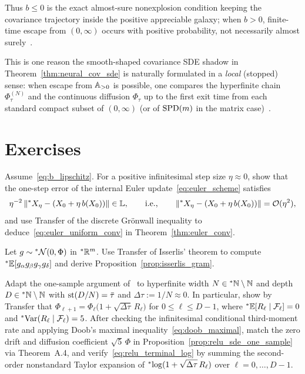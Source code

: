 Thus $b \le 0$ is the exact almost-sure nonexplosion condition keeping the covariance trajectory inside the positive appreciable galaxy; when $b > 0$, finite-time escape from $(0, \infty)$ occurs with positive probability, not necessarily almost surely~\cite[Section~4]{li2022neural}.

This is one reason the smooth-shaped covariance SDE shadow in Theorem~\ref{thm:neural_cov_sde} is naturally formulated in a \emph{local} (stopped) sense: when escape from $\mathbb{A}_{>0}$ is possible, one compares the hyperfinite chain $\Phi_\tau^{(N)}$ and the continuous diffusion $\Phi_\tau$ up to the first exit time from each standard compact subset of $(0, \infty)$ (or of $\operatorname{SPD}(m)$ in the matrix case)~\cite[Definition~3.8 and Theorem~3.9]{li2022neural}.

\section{Exercises}\label{sec:ch5_exercises}

\begin{exercise}\label{ex:local_trunc_error}
Assume~\eqref{eq:b_lipschitz}. For a positive infinitesimal step size $\eta \approx 0$, show that the one-step error of the internal Euler update~\eqref{eq:euler_scheme} satisfies
\begin{equation}\label{eq:local_trunc_O_eta2}
\eta^{-2}\left\lVert {}^*X_\eta - (X_0 + \eta\,b(X_0)) \right\rVert \in \mathbb{L}, \qquad \text{i.e.,} \qquad \left\lVert {}^*X_\eta - (X_0 + \eta\,b(X_0)) \right\rVert = \mathcal{O}(\eta^2),
\end{equation}
and use Transfer of the discrete Gr\"onwall inequality to deduce~\eqref{eq:euler_uniform_conv} in Theorem~\ref{thm:euler_conv}.
\end{exercise}

\begin{exercise}\label{ex:wick_expansion}
Let $g \sim {}^*\mathcal{N}(0, \Phi)$ in ${}^*\mathbb{R}^m$. Use Transfer of Isserlis' theorem to compute ${}^*\mathbb{E}[g_\alpha g_\beta g_\gamma g_\delta]$ and derive Proposition~\ref{prop:isserlis_gram}.
\end{exercise}

\begin{exercise}\label{ex:relu_sde_one_sample}
Adapt the one-sample argument of~\cite[\S2.2]{li2022neural} to hyperfinite width $N \in {}^*\mathbb{N} \setminus \mathbb{N}$ and depth $D \in {}^*\mathbb{N} \setminus \mathbb{N}$ with $\operatorname{st}(D/N) = \bar{\tau}$ and $\Delta\tau := 1/N \approx 0$. In particular, show by Transfer that $\Phi_{\ell+1} = \Phi_\ell\bigl(1 + \sqrt{\Delta\tau}\,R_\ell\bigr)$ for $0 \le \ell \le D - 1$, where ${}^*\mathbb{E}[R_\ell \mid \mathcal{F}_\ell] = 0$ and ${}^*\!\operatorname{Var}(R_\ell \mid \mathcal{F}_\ell) = 5$. After checking the infinitesimal conditional third-moment rate and applying Doob's maximal inequality~\eqref{eq:doob_maximal}, match the zero drift and diffusion coefficient $\sqrt{5}\,\Phi$ in Proposition~\ref{prop:relu_sde_one_sample} via Theorem~A.4, and verify~\eqref{eq:relu_terminal_log} by summing the second-order nonstandard Taylor expansion of ${}^*\!\log(1 + \sqrt{\Delta\tau}\,R_\ell)$ over $\ell = 0, \dots, D-1$.
\end{exercise}
